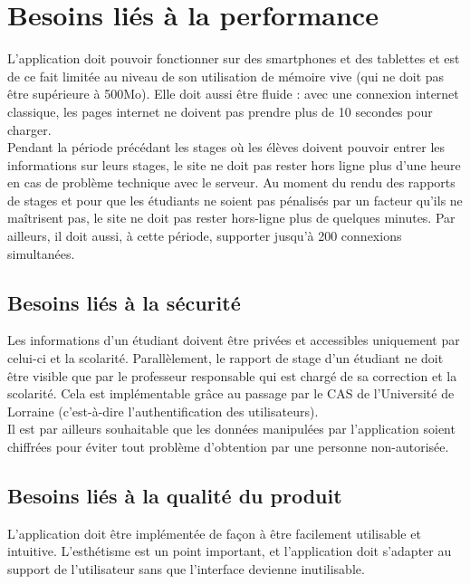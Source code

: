 \documentclass{scrreprt}
\begin{document}
\section{Besoins liés à la performance}
\hspace{1cm}L'application doit pouvoir fonctionner sur des smartphones et des tablettes et est de ce fait limitée au niveau de son utilisation de mémoire vive (qui ne doit pas être supérieure à 500Mo). Elle doit aussi être fluide : avec une connexion internet classique, les pages internet ne doivent pas prendre plus de 10 secondes pour charger.\\

\hspace{0.6cm}Pendant la période précédant les stages où les élèves doivent pouvoir entrer les informations sur leurs stages, le site ne doit pas rester hors ligne plus d'une heure en cas de problème technique avec le serveur. Au moment du rendu des rapports de stages et pour que les étudiants ne soient pas pénalisés par un facteur qu'ils ne maîtrisent pas, le site ne doit pas rester hors-ligne plus de quelques minutes. Par ailleurs, il doit aussi, à cette période, supporter jusqu'à 200 connexions simultanées.

\subsection{Besoins liés à la sécurité}
\hspace{1cm}Les informations d'un étudiant doivent être privées et accessibles uniquement par celui-ci et la scolarité. Parallèlement, le rapport de stage d'un étudiant ne doit être visible que par le professeur responsable qui est chargé de sa correction et la scolarité. Cela est implémentable grâce au passage par le CAS de l'Université de Lorraine (c'est-à-dire l'authentification des utilisateurs).\\

\hspace{0.6cm}Il est par ailleurs souhaitable que les données manipulées par l'application soient chiffrées pour éviter tout problème d'obtention par une personne non-autorisée.

\subsection{Besoins liés à la qualité du produit }
\hspace{1cm}L'application doit être implémentée de façon à être facilement utilisable et intuitive. L'esthétisme est un point important, et l'application doit s'adapter au support de l'utilisateur sans que l'interface devienne inutilisable.\\
\end{document}
